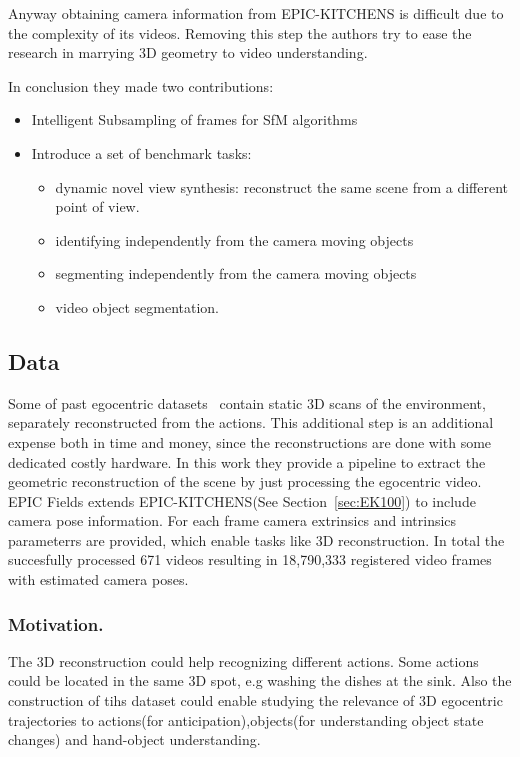 Anyway obtaining camera information from EPIC-KITCHENS is difficult due to the complexity of its videos. Removing this step
the authors try to ease the research in marrying 3D geometry to video understanding.

In conclusion they made two contributions:
\begin{itemize}
    \item Intelligent Subsampling of frames for SfM algorithms 
    \item Introduce a set of benchmark tasks: \begin{itemize}
        \item dynamic novel view synthesis: reconstruct the same scene from a different point of view.
        \item identifying independently from the camera moving objects
        \item segmenting independently from the camera moving objects
        \item video object segmentation.
    \end{itemize}
\end{itemize}

\subsection{Data}
Some of past egocentric datasets~\cite{visor35,visor5} contain static 3D scans of the environment, separately reconstructed from 
the actions. This additional step is an additional expense both in time and money, since the reconstructions are done with some dedicated costly hardware.
In this work they provide a pipeline to extract the geometric reconstruction of the scene by just processing the egocentric video.
EPIC Fields extends EPIC-KITCHENS(See Section~\ref{sec:EK100}) to include camera pose information. For each frame camera extrinsics and intrinsics parameterrs are provided, 
which enable tasks like 3D reconstruction. In total the succesfully processed 671 videos resulting in 18,790,333 registered video frames with estimated camera poses.

\subsubsection{Motivation.} 
The 3D reconstruction could help recognizing different actions. Some actions could be located in the same 3D spot, e.g washing the dishes at the sink.
Also the construction of tihs dataset could enable studying the relevance of 3D egocentric trajectories to actions(for anticipation),objects(for understanding object state changes)
and hand-object understanding.


